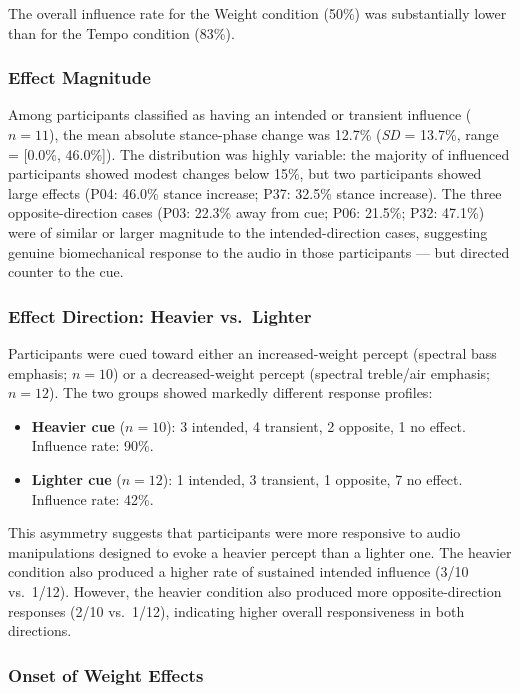 The overall influence rate for the Weight condition (50\%) was substantially
lower than for the Tempo condition (83\%).

\subsubsection{Effect Magnitude}

Among participants classified as having an intended or transient influence
($n = 11$), the mean absolute stance-phase change was 12.7\%
(\textit{SD} = 13.7\%, range = [0.0\%, 46.0\%]). The distribution was highly
variable: the majority of influenced participants showed modest changes below
15\%, but two participants showed large effects (P04: 46.0\% stance increase;
P37: 32.5\% stance increase). The three opposite-direction cases (P03: 22.3\%
away from cue; P06: 21.5\%; P32: 47.1\%) were of similar or larger magnitude
to the intended-direction cases, suggesting genuine biomechanical response to
the audio in those participants --- but directed counter to the cue.

\subsubsection{Effect Direction: Heavier vs.\ Lighter}

Participants were cued toward either an increased-weight percept (spectral bass
emphasis; $n = 10$) or a decreased-weight percept (spectral treble/air
emphasis; $n = 12$). The two groups showed markedly different response
profiles:

\begin{itemize}
    \item \textbf{Heavier cue} ($n = 10$): 3 intended, 4 transient, 2 opposite,
          1 no effect. Influence rate: 90\%.
    \item \textbf{Lighter cue} ($n = 12$): 1 intended, 3 transient, 1 opposite,
          7 no effect. Influence rate: 42\%.
\end{itemize}

This asymmetry suggests that participants were more responsive to audio
manipulations designed to evoke a heavier percept than a lighter one. The
heavier condition also produced a higher rate of sustained intended influence
(3/10 vs.\ 1/12). However, the heavier condition also produced more
opposite-direction responses (2/10 vs.\ 1/12), indicating higher overall
responsiveness in both directions.

\subsubsection{Onset of Weight Effects}

